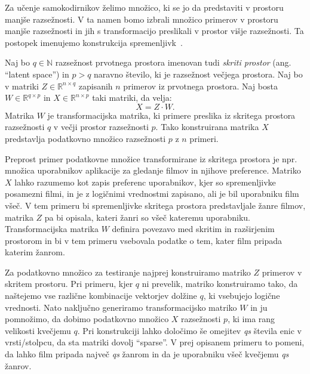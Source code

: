 \documentclass[12pt,a4paper,twoside]{article}
\theoremstyle{definition} %
\theoremstyle{plain} %
\numberwithin{equation}{section}  %
\newcommand{\R}{\mathbb R}
\newcommand{\N}{\mathbb N}
\begin{document}
Za učenje samokodirnikov želimo množico, ki se jo da predstaviti v prostoru manjše razsežnosti.
V ta namen bomo izbrali množico primerov v prostoru manjše razsežnosti in jih s transformacijo preslikali v prostor višje razsežnosti.
Ta postopek imenujemo konstrukcija spremenljivk~\cite[razdelek\ 10.3]{flach2012machine}.

Naj bo $q \in \N$ razsežnost prvotnega prostora imenovan tudi \emph{skriti prostor} (ang. ``latent space'')
in $p > q$ naravno število, ki je razsežnost večjega prostora.
Naj bo v matriki $Z \in \R^{n \times q}$ zapisanih $n$ primerov iz prvotnega prostora.
Naj bosta $W \in \R^{q \times p}$ in $X \in \R^{n \times p}$ taki matriki, da velja:
\[
	X = Z \cdot W.
\]
Matrika $W$ je transformacijska matrika, ki primere preslika iz skritega prostora razsežnosti $q$ v večji prostor razsežnosti $p$.
Tako konstruirana matrika $X$ predstavlja podatkovno množico razsežnosti $p$ z $n$ primeri.

Preprost primer podatkovne množice transformirane iz skritega prostora je npr. množica uporabnikov aplikacije za gledanje filmov in njihove preference.
Matriko $X$ lahko razumemo kot zapis preferenc uporabnikov, kjer so spremenljivke posamezni filmi, in je z logičnimi vrednostmi zapisano, ali je bil uporabniku film všeč.
V tem primeru bi spremenljivke skritega prostora predstavljale žanre filmov, matrika $Z$ pa bi opisala, kateri žanri so všeč kateremu uporabniku.
Transformacijska matrika $W$ definira povezavo med skritim in razširjenim prostorom in bi v tem primeru vsebovala podatke o tem, kater film pripada katerim žanrom.

Za podatkovno množico za testiranje najprej konstruiramo matriko $Z$ primerov v skritem prostoru.
Pri primeru, kjer $q$ ni prevelik, matriko konstruiramo tako, da naštejemo vse različne kombinacije vektorjev dolžine $q$, ki vsebujejo logične vrednosti.
Nato naključno generiramo transformacijsko matriko $W$ in ju pomnožimo, da dobimo podatkovno množico $X$ razsežnosti $p$, ki ima rang velikosti kvečjemu $q$. %
Pri konstrukciji lahko določimo še omejitev \textit{qs} števila enic v vrsti/stolpcu, da sta matriki dovolj ``sparse''. %
V prej opisanem primeru to pomeni, da lahko film pripada največ \textit{qs} žanrom in da je uporabniku všeč kvečjemu \textit{qs} žanrov.
\end{document}
